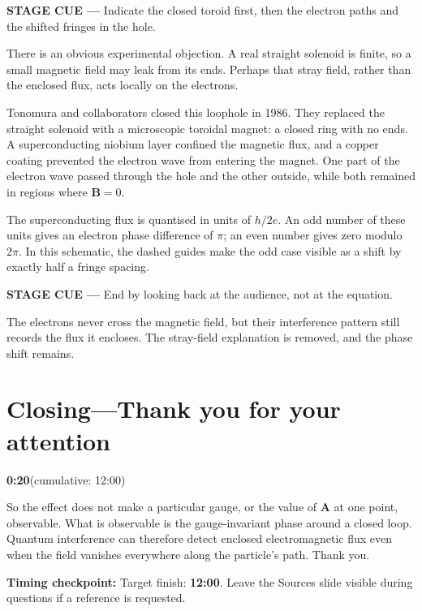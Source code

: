 \documentclass[a4paper,11pt]{article}
\newcommand{\slidetime}[2]{%
  {\small\sffamily\color{timegreen}\textbf{#1}\enspace(cumulative: #2)}%
}
\newcommand{\cue}[1]{%
  \par\smallskip
  \noindent
  {\small\sffamily\color{cueblue}\textbf{STAGE CUE ---} #1}
  \par\smallskip
}
\newcommand{\checkpoint}[1]{%
  \par\smallskip
  \noindent
  \colorbox{softgray}{%
    \parbox{0.965\linewidth}{%
      \small\sffamily\color{textgray}\textbf{Timing checkpoint:} #1}}
  \par\smallskip
}
\newenvironment{spoken}{%
  \begin{list}{}{%
    \setlength{\leftmargin}{1.1em}%
    \setlength{\rightmargin}{1.1em}%
    \setlength{\topsep}{2pt}%
    \setlength{\partopsep}{0pt}%
    \setlength{\parsep}{5pt}%
    \setlength{\itemsep}{0pt}}%
  \item\relax
}{\end{list}}
\newcommand{\slideheading}[4]{%
  \needspace{10\baselineskip}
  \section*{#1\enspace---\enspace#2}
  \vspace{-0.7em}
  \noindent\slidetime{#3}{#4}\par\smallskip
}
\begin{document}
\cue{Indicate the closed toroid first, then the electron paths and the shifted
fringes in the hole.}

\begin{spoken}
There is an obvious experimental objection. A real straight solenoid is
finite, so a small magnetic field may leak from its ends. Perhaps that stray
field, rather than the enclosed flux, acts locally on the electrons.

Tonomura and collaborators closed this loophole in 1986. They replaced the
straight solenoid with a microscopic toroidal magnet: a closed ring with no
ends. A superconducting niobium layer confined the magnetic flux, and a copper
coating prevented the electron wave from entering the magnet. One part of the
electron wave passed through the hole and the other outside, while both
remained in regions where \(\mathbf B=0\).

The superconducting flux is quantised in units of \(h/2e\). An odd number of
these units gives an electron phase difference of \(\pi\); an even number
gives zero modulo \(2\pi\). In this schematic, the dashed guides make the
odd case visible as a shift by exactly half a fringe spacing.
\end{spoken}

\cue{End by looking back at the audience, not at the equation.}

\begin{spoken}
The electrons never cross the magnetic field, but their interference pattern
still records the flux it encloses. The stray-field explanation is removed,
and the phase shift remains.
\end{spoken}


\slideheading{Closing}{Thank you for your attention}{0:20}{12:00}

\begin{spoken}
So the effect does not make a particular gauge, or the value of
\(\mathbf A\) at one point, observable. What is observable is the
gauge-invariant phase around a closed loop. Quantum interference can therefore
detect enclosed electromagnetic flux even when the field vanishes everywhere
along the particle's path. Thank you.
\end{spoken}

\checkpoint{Target finish: \textbf{12:00}. Leave the Sources slide visible
during questions if a reference is requested.}
\end{document}

